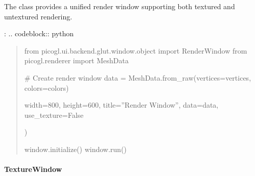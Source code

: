 \documentclass[a4paper,10pt,english,openany,oneside]{sphinxmanual}
\begin{document}
\begin{fulllineitems}

\begin{fulllineitems}
\label{\detokenize{api/ui:picogl.ui.backend.glut.window.object.RenderWindow.initialize}}
\pysigstartsignatures
\pysiglinewithargsret
{}
{}
{}
\pysigstopsignatures
\end{fulllineitems}


\end{fulllineitems}


\sphinxAtStartPar
The  class provides a unified render window supporting both textured and untextured rendering.

\sphinxAtStartPar
{}:
.. code\sphinxhyphen{}block:: python
\begin{quote}

\sphinxAtStartPar
from picogl.ui.backend.glut.window.object import RenderWindow
from picogl.renderer import MeshData

\sphinxAtStartPar
\# Create render window
data = MeshData.from\_raw(vertices=vertices, colors=colors)
\begin{description}
\sphinxAtStartPar
width=800,
height=600,
title=”Render Window”,
data=data,
use\_texture=False

\end{description}

\sphinxAtStartPar
)

\sphinxAtStartPar
window.initialize()
window.run()
\end{quote}


\paragraph{TextureWindow}
\label{\detokenize{api/ui:texturewindow}}
\end{document}
